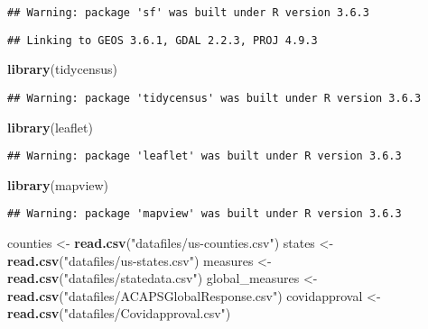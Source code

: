 \documentclass[
]{article}
\newenvironment{Shaded}{\begin{snugshade}}{\end{snugshade}}
\newcommand{\KeywordTok}[1]{\textcolor[rgb]{0.13,0.29,0.53}{\textbf{#1}}}
\newcommand{\NormalTok}[1]{#1}
\newcommand{\StringTok}[1]{\textcolor[rgb]{0.31,0.60,0.02}{#1}}
\begin{document}
\begin{verbatim}
## Warning: package 'sf' was built under R version 3.6.3
\end{verbatim}

\begin{verbatim}
## Linking to GEOS 3.6.1, GDAL 2.2.3, PROJ 4.9.3
\end{verbatim}

\begin{Shaded}
\begin{Highlighting}[]
\KeywordTok{library}\NormalTok{(tidycensus)}
\end{Highlighting}
\end{Shaded}

\begin{verbatim}
## Warning: package 'tidycensus' was built under R version 3.6.3
\end{verbatim}

\begin{Shaded}
\begin{Highlighting}[]
\KeywordTok{library}\NormalTok{(leaflet)}
\end{Highlighting}
\end{Shaded}

\begin{verbatim}
## Warning: package 'leaflet' was built under R version 3.6.3
\end{verbatim}

\begin{Shaded}
\begin{Highlighting}[]
\KeywordTok{library}\NormalTok{(mapview)}
\end{Highlighting}
\end{Shaded}

\begin{verbatim}
## Warning: package 'mapview' was built under R version 3.6.3
\end{verbatim}

\begin{Shaded}
\begin{Highlighting}[]
\NormalTok{counties <-}\StringTok{ }\KeywordTok{read.csv}\NormalTok{(}\StringTok{"datafiles/us-counties.csv"}\NormalTok{)}
\NormalTok{states <-}\StringTok{ }\KeywordTok{read.csv}\NormalTok{(}\StringTok{"datafiles/us-states.csv"}\NormalTok{)}
\NormalTok{measures <-}\StringTok{ }\KeywordTok{read.csv}\NormalTok{(}\StringTok{"datafiles/statedata.csv"}\NormalTok{)}
\NormalTok{global_measures <-}\StringTok{ }\KeywordTok{read.csv}\NormalTok{(}\StringTok{"datafiles/ACAPSGlobalResponse.csv"}\NormalTok{)}
\NormalTok{covidapproval <-}\StringTok{ }\KeywordTok{read.csv}\NormalTok{(}\StringTok{"datafiles/Covidapproval.csv"}\NormalTok{)}
\end{Highlighting}
\end{Shaded}
\end{document}
